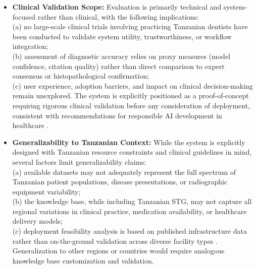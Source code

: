 \documentclass[12pt,a4paper]{report}
\begin{document}
\begin{itemize}
		\item \textbf{Clinical Validation Scope:} Evaluation is primarily technical and system-focused rather than clinical, with the following implications: \\
		(a) no large-scale clinical trials involving practicing Tanzanian dentists have been conducted to validate system utility, trustworthiness, or workflow integration; \\
		(b) assessment of diagnostic accuracy relies on proxy measures (model confidence, citation quality) rather than direct comparison to expert consensus or histopathological confirmation; \\
		(c) user experience, adoption barriers, and impact on clinical decision-making remain unexplored. The system is explicitly positioned as a proof-of-concept requiring rigorous clinical validation before any consideration of deployment, consistent with recommendations for responsible AI development in healthcare \cite{ji2023survey,Wada2025RAGRadiology,Rokhshad2025,schwendicke2022ai_global}.
		
		\item \textbf{Generalizability to Tanzanian Context:} While the system is explicitly designed with Tanzanian resource constraints and clinical guidelines in mind, several factors limit generalizability claims: \\
		(a) available datasets may not adequately represent the full spectrum of Tanzanian patient populations, disease presentations, or radiographic equipment variability; \\
		(b) the knowledge base, while including Tanzanian STG, may not capture all regional variations in clinical practice, medication availability, or healthcare delivery models; \\
		(c) deployment feasibility analysis is based on published infrastructure data rather than on-the-ground validation across diverse facility types \cite{Edward2024OralHealthTZ,tanzania_oral_health_policy}. Generalization to other regions or countries would require analogous knowledge base customization and validation.
		

\end{itemize}
\end{document}
